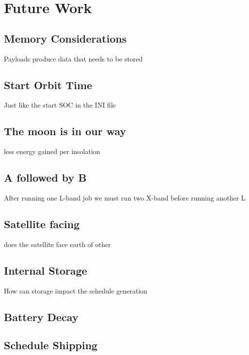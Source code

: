 \section{Future Work} \label{sec:future}

\subsection{Memory Considerations}
Payloads produce data that needs to be stored

\subsection{Start Orbit Time}
Just like the start SOC in the INI file

\subsection{The moon is in our way}
less energy gained per insolation

\subsection{A followed by B}
After running one L-band job we must run two X-band before running another L

\subsection{Satellite facing}
does the satellite face earth of other

\subsection{Internal Storage}
How can storage impact the schedule generation

\subsection{Battery Decay}

\subsection{Schedule Shipping}
